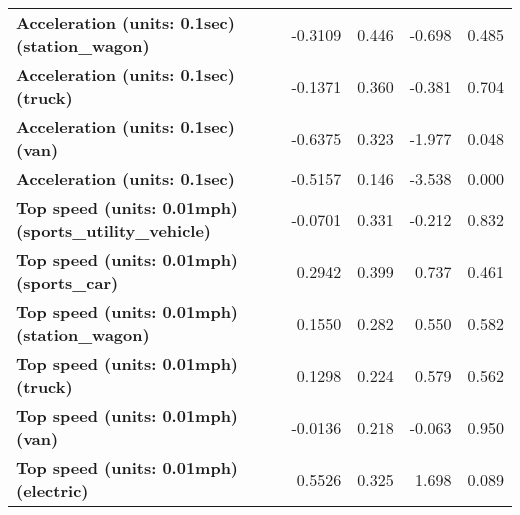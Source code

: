 \begin{tabular}{lrrrr}
\textbf{Acceleration (units: 0.1sec) (station\_wagon)}           &      -0.3109  &        0.446     &    -0.698  &         0.485        \\
\textbf{Acceleration (units: 0.1sec) (truck)}                    &      -0.1371  &        0.360     &    -0.381  &         0.704        \\
\textbf{Acceleration (units: 0.1sec) (van)}                      &      -0.6375  &        0.323     &    -1.977  &         0.048        \\
\textbf{Acceleration (units: 0.1sec)}                            &      -0.5157  &        0.146     &    -3.538  &         0.000        \\
\textbf{Top speed (units: 0.01mph) (sports\_utility\_vehicle)}   &      -0.0701  &        0.331     &    -0.212  &         0.832        \\
\textbf{Top speed (units: 0.01mph) (sports\_car)}                &       0.2942  &        0.399     &     0.737  &         0.461        \\
\textbf{Top speed (units: 0.01mph) (station\_wagon)}             &       0.1550  &        0.282     &     0.550  &         0.582        \\
\textbf{Top speed (units: 0.01mph) (truck)}                      &       0.1298  &        0.224     &     0.579  &         0.562        \\
\textbf{Top speed (units: 0.01mph) (van)}                        &      -0.0136  &        0.218     &    -0.063  &         0.950        \\
\textbf{Top speed (units: 0.01mph) (electric)}                   &       0.5526  &        0.325     &     1.698  &         0.089        \\
\bottomrule
\end{tabular}
